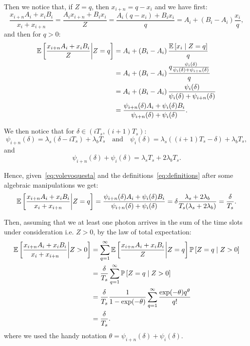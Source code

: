\noindent
Then we notice that, if \(Z =q\), then \(x_{i+n}=q-x_i\) and we have first:
\begin{equation}
\frac{x_{i+n}A_i+x_iB_i}{x_i+x_{i+n}}=
\frac{A_i x_{i+n}+B_i x_i}{Z}=\frac{A_i(q-x_i)+B_i x_i}{q}=A_i+\left(B_i-A_i\right) \frac{x_i}{q},
\end{equation}
and then for \(q> 0\):
\begin{equation}
\begin{aligned}
\mathbb{E}\left[{\frac{x_{i+n}A_i+x_iB_i}{Z} \bigg| Z=q}\right]
&=
A_i+\left(B_i-A_i\right) \frac{\mathbb{E}\left[{x_i\mid Z=q}\right]}{q}\\
&=
A_i+\left(B_i-A_i\right) \frac{q\frac{\psi_{i}(\delta)}{\psi_{i}(\delta)+\psi_{i+n}(\delta)}}{q}\\
&=
A_i+\left(B_i-A_i\right) \frac{\psi_{i}(\delta)}{\psi_{i}(\delta)+\psi_{i+n}(\delta)}\\
&=
\frac{\psi_{i+n}(\delta)A_i+\psi_{i}(\delta)B_i}{\psi_{i+n}(\delta)+\psi_{i}(\delta)}.
\end{aligned}
\label{eq:volevoquesta}
\end{equation}

\noindent
We then notice that for \(\delta \in(iT_s,(i+1)T_s)\):
\begin{equation}
\psi_{i+n}(\delta)=\lambda_s\left( \delta-i T_s\right)+\lambda_b T_s
\quad \text{and} \quad
\psi_{i}(\delta)=\lambda_s\left((i+1) T_s -\delta\right)+\lambda_b T_s,
\end{equation}
and
\begin{equation}
\psi_{i+n}(\delta)+\psi_{i}(\delta)
=\lambda_sT_s+2\lambda_b T_s.
\end{equation}

\noindent
Hence, given~\eqref{eq:volevoquesta} and the definitions~\eqref{eq:definitions} after some algebraic manipulations we get:
\begin{equation}
\mathbb{E}\left[{\frac{x_{i+n}A_i+x_iB_i}{x_i+x_{i+n}} \bigg| Z=q}\right]
=
\frac{\psi_{i+n}(\delta)A_i+\psi_{i}(\delta)B_i}{\psi_{i+n}(\delta)+\psi_{i}(\delta)}
= \delta\frac{\lambda_s+2\lambda_b}{T_s(\lambda_s+2\lambda_b)}
= \frac{\delta}{T_s}.
\label{eq:theresulting}
\end{equation}

\noindent
Then, assuming that we at least one photon arrives in the sum of the time slots under consideration i.e. \(Z>0\), by the law of total expectation:
\begin{equation}
\begin{aligned}
\mathbb{E}\left[{\frac{x_{i+n}A_i+x_iB_i}{x_i+x_{i+n}}\bigg|Z>0}\right]
& =
\sum_{q=1}^{\infty}
\mathbb{E}\left[{\frac{x_{i+n}A_i+x_iB_i}{Z}\bigg| Z=q}\right]\mathbb{P}\left[{Z=q\mid Z>0}\right]\\
& =
\frac{\delta}{T_s}
\sum_{q=1}^{\infty}
\mathbb{P}\left[{Z=q\mid Z>0}\right]\\
& =
\frac{\delta}{T_s}
\frac{1}{1-\exp(-\theta)}\sum_{q=1}^{\infty}\frac{\exp(-\theta)q^\theta}{q!}\\
&=
\frac{\delta}{T_s}.
\end{aligned}
\end{equation}
where we used the handy notation \(\theta=\psi_{i+n}(\delta)+\psi_{i}(\delta)\).

